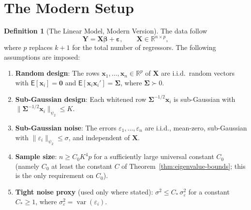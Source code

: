\documentclass[12pt,a4paper]{article}
\theoremstyle{definition}
\newtheorem{definition}[theorem]{Definition}
\newcommand\expc{\mathsf{E}}
\DeclareMathOperator\var{var}
\newcommand{\bX}{\mathbf{X}}
\newcommand{\bY}{\mathbf{Y}}
\newcommand{\bx}{\mathbf{x}}
\def\bb{\boldsymbol{\beta}}
\newcommand{\be}{\boldsymbol{\varepsilon}}
\newcommand{\bzero}{\mathbf{0}}
\newcommand{\Real}{\mathbb{R}}
\newcommand{\bSigma}{\boldsymbol{\Sigma}}
\begin{document}
\section{The Modern Setup}\label{sec:modern-setup}

\begin{definition}[The Linear Model, Modern Version]\label{def:modern-model}
The data follow
\begin{equation}\label{eq:modern-model}
\bY = \bX\bb + \be, \qquad \bX \in \Real^{n \times p},
\end{equation}
where $p$ replaces $k+1$ for the total number of regressors. The following assumptions are imposed:
\begin{enumerate}[label=\textup{(M\arabic*)}]
\item\label{M1} \textbf{Random design}: The rows $\bx_1, \ldots, \bx_n \in \Real^p$ of $\bX$ are i.i.d.\ random vectors with $\expc[\bx_i] = \bzero$ and $\expc[\bx_i\bx_i'] = \bSigma$, where $\bSigma \succ 0$.
\item\label{M2} \textbf{Sub-Gaussian design}: Each whitened row $\bSigma^{-1/2}\bx_i$ is sub-Gaussian with $\|\bSigma^{-1/2}\bx_i\|_{\psi_2} \leqslant K$.
\item\label{M3} \textbf{Sub-Gaussian noise}: The errors $\varepsilon_1, \ldots, \varepsilon_n$ are i.i.d., mean-zero, sub-Gaussian with $\|\varepsilon_i\|_{\psi_2} \leqslant \sigma$, and independent of $\bX$.
\item\label{M4} \textbf{Sample size}: $n \geqslant C_0 K^4 p$ for a sufficiently large universal constant $C_0$ (namely $C_0$ at least the constant $C$ of Theorem~\ref{thm:eigenvalue-bounds}; this is the only requirement on $C_0$).
\item\label{M5} \textbf{Tight noise proxy} (used only where stated): $\sigma^2 \leqslant C_*\,\sigma_\varepsilon^2$ for a constant $C_* \geqslant 1$, where $\sigma_\varepsilon^2 = \var(\varepsilon_i)$.
\end{enumerate}
\end{definition}
\end{document}
